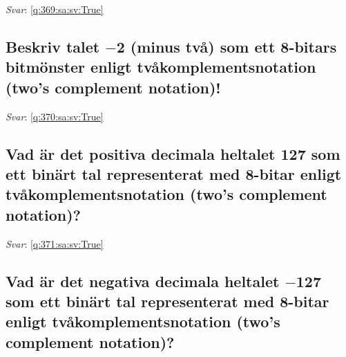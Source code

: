 \documentclass[a4paper,11pt,oneside]{article}
\begin{document}
\begin{sloppypar}
\label{q:369:sa:sv:False}

\vspace{2cm}

\noindent\makebox[\textwidth]{\hrulefill}

\vspace{1cm}

\textit{Svar}: \autoref{q:369:sa:sv:True}



\subsection{Beskriv talet \ensuremath{-}2 (minus tv\r{a}) som ett 8-bitars bitm\"onster enligt tv\r{a}komplementsnotation (two{\textquoteright}s complement notation)!}

\label{q:370:sa:sv:False}

\vspace{2cm}

\noindent\makebox[\textwidth]{\hrulefill}

\vspace{1cm}

\textit{Svar}: \autoref{q:370:sa:sv:True}



\subsection{Vad \"ar det positiva decimala heltalet 127 som ett bin\"art tal representerat med 8-bitar enligt tv\r{a}komplementsnotation (two{\textquoteright}s complement notation)?}

\label{q:371:sa:sv:False}

\vspace{2cm}

\noindent\makebox[\textwidth]{\hrulefill}

\vspace{1cm}

\textit{Svar}: \autoref{q:371:sa:sv:True}



\subsection{Vad \"ar det negativa decimala heltalet \ensuremath{-}127 som ett bin\"art tal representerat med 8-bitar enligt tv\r{a}komplementsnotation (two{\textquoteright}s complement notation)?}

\label{q:372:sa:sv:False}


\end{sloppypar}
\end{document}
